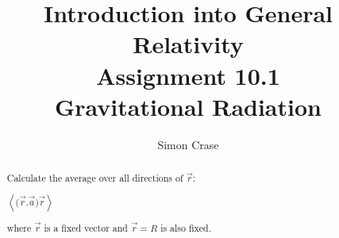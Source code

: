 \documentclass[]{article}
\title{Introduction into General Relativity\\Assignment 10.1\\Gravitational Radiation}
\author{Simon Crase}
\begin{document}
\maketitle

\begin{abstract}
Calculate the average over all directions of $\vec{r}$:

$\left\langle \big(\vec{r}.\vec{a}\big)\vec{r} \right\rangle$

where $\vec{r}$ is a fixed vector and $\vec{r}=R$ is also fixed.
\end{abstract}

\section{}
\end{document}
